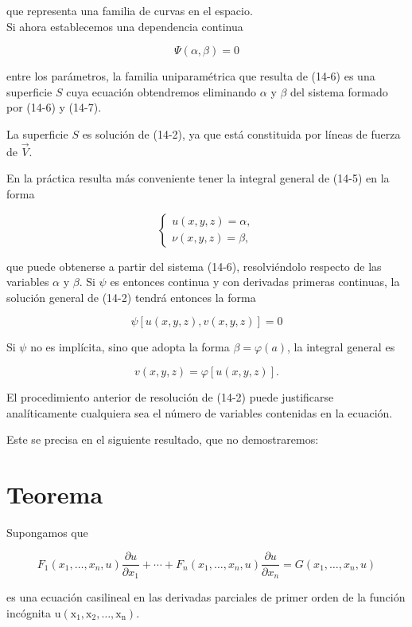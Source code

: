 \documentclass[10pt]{article}
\theoremstyle{plain}
\theoremstyle{definition}
\theoremstyle{remark}
\begin{document}
que representa una familia de curvas en el espacio.\\
Si ahora establecemos una dependencia continua


\begin{equation*}
\Psi(\alpha, \beta)=0 \tag{14-7}
\end{equation*}


entre los parámetros, la familia uniparamétrica que resulta de (14-6) es una superficie $S$ cuya ecuación obtendremos eliminando $\alpha$ y $\beta$ del sistema formado por (14-6) y (14-7).

La superficie $S$ es solución de (14-2), ya que está constituida por líneas de fuerza de $\vec{V}$.

En la práctica resulta más conveniente tener la integral general de (14-5) en la forma

$$
\left\{\begin{array}{l}
u(x, y, z)=\alpha, \\
\nu(x, y, z)=\beta,
\end{array}\right.
$$

que puede obtenerse a partir del sistema (14-6), resolviéndolo respecto de las variables $\alpha$ y $\beta$. Si $\psi$ es entonces continua y con derivadas primeras continuas, la solución general de (14-2) tendrá entonces la forma

$$
\psi[u(x, y, z), v(x, y, z)]=0
$$

Si $\psi$ no es implícita, sino que adopta la forma $\beta=\varphi(a)$, la integral general es

$$
v(x, y, z)=\varphi[u(x, y, z)] .
$$

El procedimiento anterior de resolución de (14-2) puede justificarse analíticamente cualquiera sea el número de variables contenidas en la ecuación.

Este se precisa en el siguiente resultado, que no demostraremos:

\section*{Teorema}
Supongamos que

$$
F_{1}\left(x_{1}, \ldots, x_{n}, u\right) \frac{\partial u}{\partial x_{1}}+\cdots+F_{n}\left(x_{1}, \ldots, x_{n}, u\right) \frac{\partial u}{\partial x_{n}}=G\left(x_{1}, \ldots, x_{n}, u\right)
$$

es una ecuación casilineal en las derivadas parciales de primer orden de la función incógnita $\mathrm{u}\left(\mathrm{x}_{1}, \mathrm{x}_{2}, \ldots, \mathrm{x}_{\mathrm{n}}\right)$.
\end{document}
